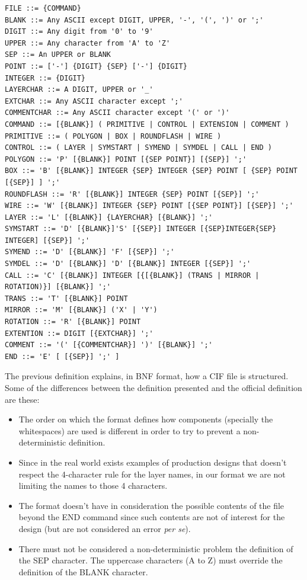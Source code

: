 \documentclass[11pt,twoside,openany,x11names,svgnames]{memoir}
\begin{document}
\begin{verbatim}
FILE ::= {COMMAND}
BLANK ::= Any ASCII except DIGIT, UPPER, '-', '(', ')' or ';'
DIGIT ::= Any digit from '0' to '9'
UPPER ::= Any character from 'A' to 'Z'
SEP ::= An UPPER or BLANK
POINT ::= ['-'] {DIGIT} {SEP} ['-'] {DIGIT}
INTEGER ::= {DIGIT}
LAYERCHAR ::= A DIGIT, UPPER or '_'
EXTCHAR ::= Any ASCII character except ';'
COMMENTCHAR ::= Any ASCII character except '(' or ')'
COMMAND ::= [{BLANK}] ( PRIMITIVE | CONTROL | EXTENSION | COMMENT )
PRIMITIVE ::= ( POLYGON | BOX | ROUNDFLASH | WIRE )
CONTROL ::= ( LAYER | SYMSTART | SYMEND | SYMDEL | CALL | END )
POLYGON ::= 'P' [{BLANK}] POINT [{SEP POINT}] [{SEP}] ';'
BOX ::= 'B' [{BLANK}] INTEGER {SEP} INTEGER {SEP} POINT [ {SEP} POINT [{SEP}] ] ';'
ROUNDFLASH ::= 'R' [{BLANK}] INTEGER {SEP} POINT [{SEP}] ';'
WIRE ::= 'W' [{BLANK}] INTEGER {SEP} POINT [{SEP POINT}] [{SEP}] ';'
LAYER ::= 'L' [{BLANK}] {LAYERCHAR} [{BLANK}] ';'
SYMSTART ::= 'D' [{BLANK}]'S' [{SEP}] INTEGER [{SEP}INTEGER{SEP} INTEGER] [{SEP}] ';'
SYMEND ::= 'D' [{BLANK}] 'F' [{SEP}] ';'
SYMDEL ::= 'D' [{BLANK}] 'D' [{BLANK}] INTEGER [{SEP}] ';'
CALL ::= 'C' [{BLANK}] INTEGER [{[{BLANK}] (TRANS | MIRROR | ROTATION)}] [{BLANK}] ';'
TRANS ::= 'T' [{BLANK}] POINT
MIRROR ::= 'M' [{BLANK}] ('X' | 'Y')
ROTATION ::= 'R' [{BLANK}] POINT
EXTENTION ::= DIGIT [{EXTCHAR}] ';'
COMMENT ::= '(' [{COMMENTCHAR}] ')' [{BLANK}] ';'
END ::= 'E' [ [{SEP}] ';' ]
\end{verbatim}

The previous definition explains, in BNF format, how a CIF file is structured. Some of the differences between the definition presented and the official definition are these:

\begin{itemize}
\item The order on which the format defines how components (specially the whitespaces) are used is different in order to try to prevent a non-deterministic definition.
\item Since in the real world exists examples of production designs that doesn't respect the 4-character rule for the layer names, in our format we are not limiting the names to those 4 characters.
\item The format doesn't have in consideration the possible contents of the file beyond the END command since such contents are not of interest for the design (but are not considered an error \textit{per se}).
\item There must not be considered a non-deterministic problem the definition of the SEP character. The uppercase characters (A to Z) must override the definition of the BLANK character.
\end{itemize}
\end{document}
